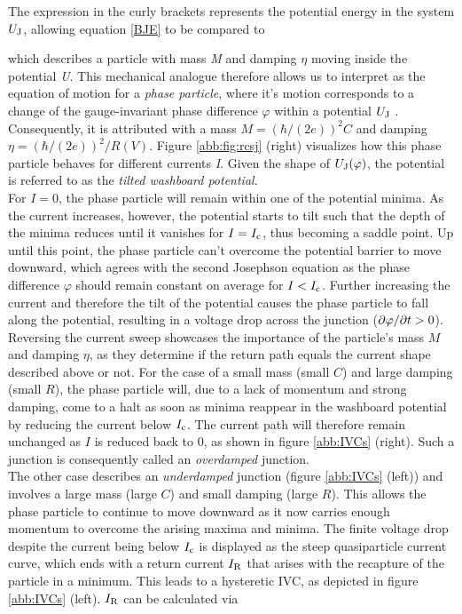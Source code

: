 The expression in the curly brackets represents the potential energy in the system $U_{\rm J}$, allowing equation \ref{BJE} to be compared to 


which describes a particle with mass \textit{M} and damping $\eta$ moving inside the potential \textit{U}. This mechanical analogue therefore allows us to interpret as the equation of motion for a \textit{phase particle}, where it's motion corresponds to a change of the gauge-invariant phase difference $\varphi$ within a potential $U_{\rm J}$ \cite{Clarke2004}. Consequently, it is attributed with a mass $M=\left(\hbar/(2e)\right)^2C$ and damping $\eta=\left(\hbar/(2e)\right)^2/R(V)$. Figure \ref{abb:fig:rcsj} (right) visualizes how this phase particle behaves for different currents \textit{I}. Given the shape of $U_{\rm J}(\varphi)$, the potential is referred to as the \textit{tilted washboard potential}. \\
For $I=0$, the phase particle will remain within one of the potential minima. As the current increases, however, the potential starts to tilt such that the depth of the minima reduces until it vanishes for $I=I_{\rm c}$, thus becoming a saddle point. Up until this point, the phase particle can't overcome the potential barrier to move downward, which agrees with the second Josephson equation as the phase difference $\varphi$ should remain constant on average for $I<I_{\rm c}$. Further increasing the current and therefore the tilt of the potential causes the phase particle to fall along the potential, resulting in a voltage drop across the junction ($\partial\varphi/\partial t>0$). \\

Reversing the current sweep showcases the importance of the particle's mass $M$ and damping $\eta$, as they determine if the return path equals the current shape described above or not. For the case of a small mass (small $C$) and large damping (small $R$), the phase particle will, due to a lack of momentum and strong damping, come to a halt as soon as minima reappear in the washboard potential by reducing the current below $I_{\rm c}$. The current path will therefore remain unchanged as $I$ is reduced back to 0, as shown in figure \ref{abb:IVCs} (right). Such a junction is consequently called an \textit{overdamped} junction. \\
The other case describes an \textit{underdamped} junction (figure \ref{abb:IVCs} (left)) and involves a large mass (large $C$) and small damping (large $R$). This allows the phase particle to continue to move downward as it now carries enough momentum to overcome the arising maxima and minima. The finite voltage drop despite the current being below $I_{\rm c}$ is displayed as the steep quasiparticle current curve, which ends with a return current $I_{\rm R}$ that arises with the recapture of the particle in a minimum. This leads to a hysteretic IVC, as depicted in figure \ref{abb:IVCs} (left). $I_{\rm R}$ can be calculated via \cite{Likharev1986}


